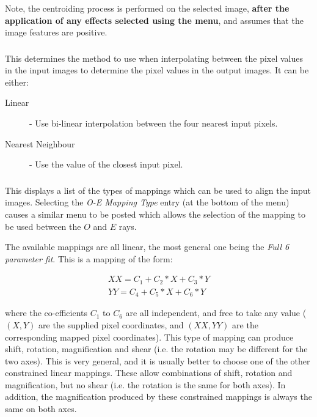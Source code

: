 Note, the centroiding process is performed on the selected image, {\bf
after the application of any effects selected using the  menu}, and assumes that the image features
are positive.

\subsubsection {}
This determines the method to use when interpolating between the pixel
values in the input images to determine the pixel values in the output
images. It can be either:

\begin{description}
\item [Linear] - Use bi-linear interpolation between the four nearest
input pixels.
\item [Nearest Neighbour] - Use the value of the closest input pixel.
\end{description}

\subsubsection {} This displays a list of
the types of mappings which can be used to align the input images.
Selecting the {\em O-E Mapping Type} entry (at the bottom of the menu)
causes a similar menu to be posted which allows the selection of the
mapping to be used between the $O$ and $E$ rays.

The available mappings are all linear, the most general one being the
{\em Full 6 parameter fit}. This is a mapping of the form:

\begin{eqnarray*}
XX = C_{1} + C_{2}*X + C_{3}*Y \\
YY = C_{4} + C_{5}*X + C_{6}*Y 
\end{eqnarray*}

where the co-efficients $C_{1}$ to $C_{6}$ are all independent, and free
to take any value ($(X,Y)$ are the supplied pixel coordinates, and
$(XX,YY)$ are the corresponding mapped pixel coordinates). This type of
mapping can produce shift, rotation, magnification and shear (i.e. the 
rotation may be different for the two axes). This is very general,
and it is usually better to choose one of the other constrained linear 
mappings. These allow
combinations of shift, rotation and magnification, but no shear (i.e. the
rotation is the same for both axes). In addition, the magnification
produced by these constrained mappings is always the same on both axes.

